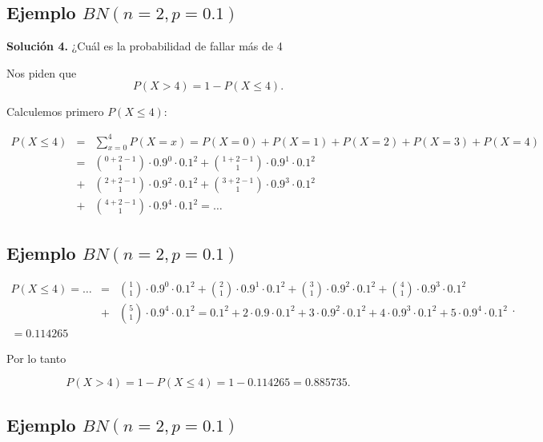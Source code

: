 \documentclass[]{book}
\begin{document}
\hypertarget{ejemplo-bnn2p0.1-5}{%
\subsection{\texorpdfstring{Ejemplo \(BN(n=2,p=0.1)\)}{Ejemplo BN(n=2,p=0.1)}}\label{ejemplo-bnn2p0.1-5}}

\textbf{Solución 4.} ¿Cuál es la probabilidad de fallar más de 4

Nos piden que\\
\[
P(X>4)=1-P(X\leq 4).
\]

Calculemos primero \(P(X\leq 4):\)

\[
\begin{eqnarray*}
P(X\leq 4) &= & \displaystyle\sum_{x=0}^{4} P(X=x)=P(X=0)+P(X=1)+P(X=2)+P(X=3)+P(X=4)\\
&=& {0+2-1\choose 1} \cdot 0.9^{0}\cdot 0.1^2+
    {1+2-1\choose 1} \cdot 0.9^{1}\cdot 0.1^2\\
  &+&
    {2+2-1\choose 1} \cdot 0.9^{2}\cdot 0.1^2+
    {3+2-1\choose 1} \cdot 0.9^{3}\cdot 0.1^2 \\ 
  &+&
    {4+2-1\choose 1} \cdot 0.9^{4}\cdot 0.1^2=\ldots
\end{eqnarray*}
\]

\hypertarget{ejemplo-bnn2p0.1-6}{%
\subsection{\texorpdfstring{Ejemplo \(BN(n=2,p=0.1)\)}{Ejemplo BN(n=2,p=0.1)}}\label{ejemplo-bnn2p0.1-6}}

\[
\begin{eqnarray*}
P(X\leq 4)=\ldots   &=& 
{1\choose 1} \cdot 0.9^{0}\cdot 0.1^2+
{2\choose 1} \cdot 0.9^{1}\cdot 0.1^2+  
{3\choose 1} \cdot 0.9^{2}\cdot 0.1^2+
{4\choose 1} \cdot 0.9^{3}\cdot 0.1^2\\ 
  &+&
{5\choose 1} \cdot 0.9^{4}\cdot 0.1^2=
0.1^2+
2\cdot 0.9 \cdot 0.1^2+
3\cdot 0.9^2\cdot 0.1^2+
4\cdot 0.9^3\cdot 0.1^2+
5\cdot 0.9^4\cdot 0.1^2\\
=
0.114265
\end{eqnarray*}.
\]

Por lo tanto

\[
P(X>4)=1-P(X\leq 4)=1-0.114265=
0.885735.
\]

\hypertarget{ejemplo-bnn2p0.1-7}{%
\subsection{\texorpdfstring{Ejemplo \(BN(n=2,p=0.1)\)}{Ejemplo BN(n=2,p=0.1)}}\label{ejemplo-bnn2p0.1-7}}
\end{document}
